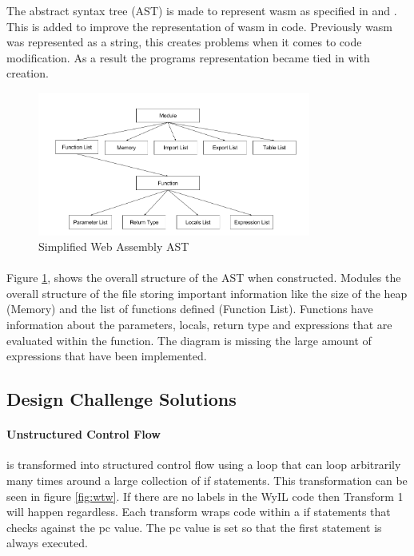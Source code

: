 The abstract syntax tree (AST) is made to represent wasm as specified in \cite{11_webassembly/spec_2016} and \cite{10_gohman_bastien_wagner_2016}.  This is added to improve the representation of wasm in code. Previously wasm was represented as a string, this creates problems when it comes to code modification. As a result the programs representation became tied in with creation.

\begin{figure}[H]
  \centering
  \includegraphics[width=0.8\textwidth]{AST}
  \caption{Simplified Web Assembly AST}
  \label{fig:ast}
\end{figure}

\paragraph{}
Figure \ref{fig:ast}, shows the overall structure of the AST when constructed. Modules the overall structure of the file storing important information like the size of the heap (Memory) and the list of functions defined (Function List). Functions have information about the parameters, locals, return type and expressions that are evaluated within the function. The diagram is missing the large amount of expressions that have been implemented. 

\subsection{Design Challenge Solutions}\label{subsec:didcs}

\paragraph{Unstructured Control Flow}
is transformed into structured control flow using a loop that can loop arbitrarily many times around a large collection of if statements. This transformation can be seen in figure \ref{fig:wtw}. If there are no labels in the WyIL code then Transform 1 will happen regardless. Each transform wraps code within a if statements that checks against the pc value. The pc value is set so that the first statement is always executed. 

